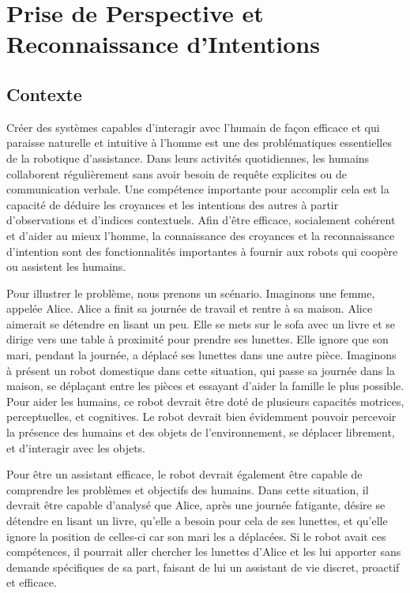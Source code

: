 \documentclass[a4paper,11pt,twoside]{StyleThese}
\begin{document}
\setcounter{chapter}{3} %
\dominitoc
\faketableofcontents
\fi

\chapter{Prise de Perspective et Reconnaissance d'Intentions}
\label{chapter4}
\minitoc

\section{Contexte}
Créer des systèmes capables d'interagir avec l'humain de façon efficace et qui paraisse naturelle et intuitive à l'homme est une des problématiques essentielles de la robotique d'assistance. Dans leurs activités quotidiennes, les humains collaborent régulièrement sans avoir besoin de requête explicites ou de communication verbale. Une compétence importante pour accomplir cela est la capacité de déduire les croyances et les intentions des autres à partir d'observations et d'indices contextuels. Afin d'être efficace, socialement cohérent et d'aider au mieux l'homme, la connaissance des croyances et la reconnaissance d'intention sont des fonctionnalités importantes à fournir aux robots qui coopère ou assistent les humains.

Pour illustrer le problème, nous prenons un scénario. Imaginons une femme, appelée Alice. Alice a finit sa journée de travail et rentre à sa maison. Alice aimerait se détendre en lisant un peu. Elle se mets sur le sofa avec un livre et se dirige vers une table à proximité pour prendre ses lunettes. Elle ignore que son mari, pendant la journée, a déplacé ses lunettes dans une autre pièce.
Imaginons à présent un robot domestique dans cette situation, qui passe sa journée dans la maison, se déplaçant entre les pièces et essayant d'aider la famille le plus possible. Pour aider les humains, ce robot devrait être doté de plusieurs capacités motrices, perceptuelles, et cognitives. Le robot devrait bien évidemment pouvoir percevoir la présence des humains et des objets de l'environnement, se déplacer librement, et d'interagir avec les objets.

Pour être un assistant efficace, le robot devrait également être capable de comprendre les problèmes et objectifs des humains. Dans cette situation, il devrait être capable d'analysé que Alice, après une journée fatigante, désire se détendre en lisant un livre, qu'elle a besoin pour cela de ses lunettes, et qu'elle ignore la position de celles-ci car son mari les a déplacées. Si le robot avait ces compétences, il pourrait aller chercher les lunettes d'Alice et les lui apporter sans demande spécifiques de sa part, faisant de lui un assistant de vie discret, proactif et efficace.
\end{document}
